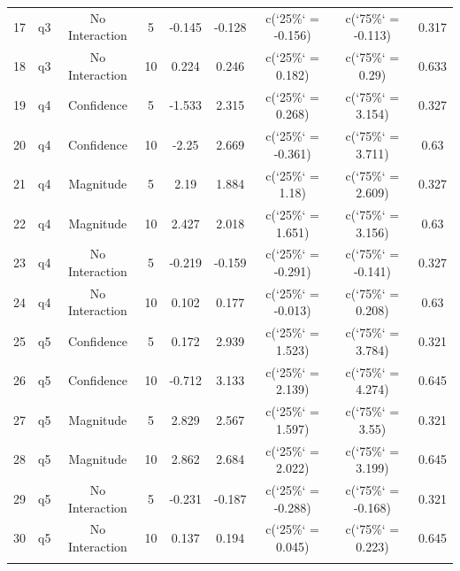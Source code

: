 \begin{table}[!htbp]
\begin{tabular}{@{\extracolsep{5pt}} ccccccccc}
17 & q3 & No Interaction & 5 & -0.145 & -0.128 & c(`25\%` = -0.156) & c(`75\%` = -0.113) & 0.317 \\ 
18 & q3 & No Interaction & 10 & 0.224 & 0.246 & c(`25\%` = 0.182) & c(`75\%` = 0.29) & 0.633 \\ 
19 & q4 & Confidence & 5 & -1.533 & 2.315 & c(`25\%` = 0.268) & c(`75\%` = 3.154) & 0.327 \\ 
20 & q4 & Confidence & 10 & -2.25 & 2.669 & c(`25\%` = -0.361) & c(`75\%` = 3.711) & 0.63 \\ 
21 & q4 & Magnitude & 5 & 2.19 & 1.884 & c(`25\%` = 1.18) & c(`75\%` = 2.609) & 0.327 \\ 
22 & q4 & Magnitude & 10 & 2.427 & 2.018 & c(`25\%` = 1.651) & c(`75\%` = 3.156) & 0.63 \\ 
23 & q4 & No Interaction & 5 & -0.219 & -0.159 & c(`25\%` = -0.291) & c(`75\%` = -0.141) & 0.327 \\ 
24 & q4 & No Interaction & 10 & 0.102 & 0.177 & c(`25\%` = -0.013) & c(`75\%` = 0.208) & 0.63 \\ 
25 & q5 & Confidence & 5 & 0.172 & 2.939 & c(`25\%` = 1.523) & c(`75\%` = 3.784) & 0.321 \\ 
26 & q5 & Confidence & 10 & -0.712 & 3.133 & c(`25\%` = 2.139) & c(`75\%` = 4.274) & 0.645 \\ 
27 & q5 & Magnitude & 5 & 2.829 & 2.567 & c(`25\%` = 1.597) & c(`75\%` = 3.55) & 0.321 \\ 
28 & q5 & Magnitude & 10 & 2.862 & 2.684 & c(`25\%` = 2.022) & c(`75\%` = 3.199) & 0.645 \\ 
29 & q5 & No Interaction & 5 & -0.231 & -0.187 & c(`25\%` = -0.288) & c(`75\%` = -0.168) & 0.321 \\ 
30 & q5 & No Interaction & 10 & 0.137 & 0.194 & c(`25\%` = 0.045) & c(`75\%` = 0.223) & 0.645 \\ 
\hline \\[-1.8ex] 
\end{tabular} 
\end{table} 
